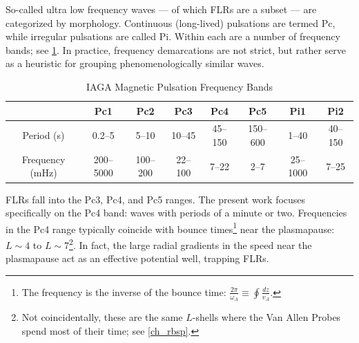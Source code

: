 
So-called ultra low frequency waves  --- of which FLRs are a subset --- are
categorized by morphology. Continuous (long-lived) pulsations are termed Pc,
while irregular pulsations are called Pi. Within each are a number of
frequency bands; see \cref{tab_iaga}\cite{jacobs_1964}. In practice, frequency
demarcations are not strict, but rather serve as a heuristic for grouping
phenomenologically similar waves\cite{hughes_1994}. 

\begin{longtable}{ @{\extracolsep{\fill}} cccccccc @{\extracolsep{\fill}} }
  \caption[IAGA Magnetic Pulsation Frequency Bands]
    {IAGA Magnetic Pulsation Frequency Bands}
  \label{tab_iaga} \\
  \toprule
  & Pc1 & Pc2 & Pc3 & Pc4 & Pc5 & Pi1 & Pi2 \\
  \midrule
  \endfirsthead
  \bottomrule
  \endlastfoot
  Period (\si{\second}) & 0.2--5    & 5--10    & 10--45  & 45--150 & 150--600 &
    1--40    & 40--150 \\
  Frequency (\si{\mHz}) & 200--5000 & 100--200 & 22--100 & 7--22   & 2--7     &
    25--1000 & 7--25 \\
\end{longtable}


FLRs fall into the Pc3, Pc4, and Pc5 ranges. The present work focuses
specifically on the Pc4 band: waves with periods of a minute or two.
Frequencies in the Pc4 range typically coincide with \Alfven bounce
times\footnote{The \Alfven frequency is the inverse of the \Alfven bounce time:
$\frac{2 \pi}{\omega_A} \equiv \oint \frac{dz}{v_A}$. } near the plasmapause:
$L\sim4$ to
$L\sim7$\cite{anderson_1990,dai_2015,engebretson_1992,liu_2009}\footnote{Not
coincidentally, these are the same $L$-shells where the Van Allen Probes
spend most of their time; see \cref{ch_rbsp}. }. In fact, the large radial
gradients in the \Alfven speed near the plasmapause act as an effective
potential well, trapping FLRs\cite{dai_2009,klimushkin_2004,lee_1999,
leonovich_2000,mager_2013,takahashi_2010}. 

